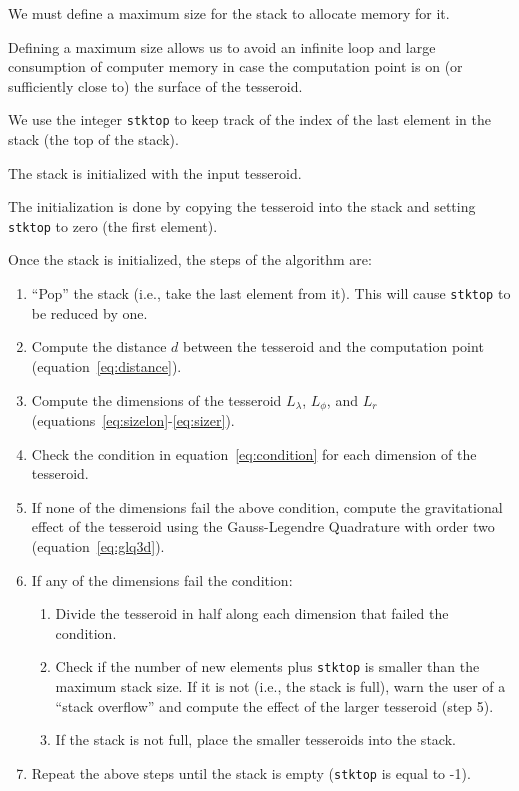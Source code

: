 \documentclass[manuscript]{geophysics}
\begin{document}
We must define a maximum size for the stack to allocate memory for it.

Defining a maximum size allows us to avoid an infinite loop and large
consumption of computer memory in case the computation point is
on (or sufficiently close to) the surface of the tesseroid.

We use the integer \texttt{stktop} to keep track of the index of the last
element in the stack (the top of the stack).

The stack is initialized with the input tesseroid.

The initialization is done by copying the tesseroid into the stack and
setting \texttt{stktop} to zero (the first element).

Once the stack is initialized, the steps of the algorithm are:

\begin{enumerate}
    \item ``Pop'' the stack (i.e., take the last element from it).
        This will cause \texttt{stktop} to be reduced by one.
    \item Compute the distance $d$ between the tesseroid and
        the computation point (equation~\ref{eq:distance}).
    \item Compute the dimensions of the tesseroid $L_\lambda$, $L_\phi$,
        and $L_r$ (equations~\ref{eq:sizelon}-\ref{eq:sizer}).
    \item Check the condition in equation~\ref{eq:condition} for each
        dimension of the tesseroid.
    \item If none of the dimensions fail the above condition,
        compute the gravitational effect of the tesseroid using the
        Gauss-Legendre Quadrature with order two
        (equation~\ref{eq:glq3d}).
    \item If any of the dimensions fail the condition:
    \begin{enumerate}
        \item Divide the tesseroid in half along each dimension that failed
             the condition.
        \item Check if the number of new elements plus \texttt{stktop}
             is smaller than the maximum stack size.
             If it is not (i.e., the stack is full),
             warn the user of a ``stack overflow''
             and compute the effect of the larger tesseroid (step 5).
        \item If the stack is not full, place the smaller tesseroids into
             the stack.
    \end{enumerate}
    \item Repeat the above steps until the stack is empty
        (\texttt{stktop} is equal to -1).
\end{enumerate}
\end{document}
